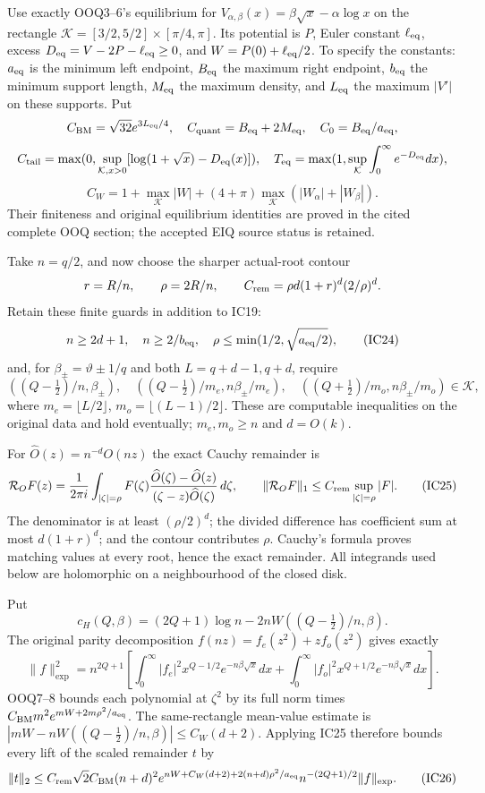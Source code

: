 \documentclass[11pt]{article}
\begin{document}
Use exactly OOQ3--6's equilibrium for \(V_{\alpha,\beta}(x)=\beta\sqrt x-\alpha\log x\) on the rectangle \(\mathcal K=[3/2,5/2]\times[\pi/4,\pi]\). Its potential is \(P\), Euler constant \(\ell_{\rm eq}\), excess \(D_{\rm eq}=V-2P-\ell_{\rm eq}\ge0\), and \(W=P(0)+\ell_{\rm eq}/2\). To specify the constants: \(a_{\rm eq}\) is the minimum left endpoint, \(B_{\rm eq}\) the maximum right endpoint, \(b_{\rm eq}\) the minimum support length, \(M_{\rm eq}\) the maximum density, and \(L_{\rm eq}\) the maximum \(|V'|\) on these supports. Put \[
C_{\rm BM}=\sqrt{32}e^{3L_{\rm eq}/4},\quad
C_{\rm quant}=B_{\rm eq}+2M_{\rm eq},\quad C_0=B_{\rm eq}/a_{\rm eq},
\] \[
C_{\rm tail}=\max(0,\sup_{\mathcal K,x>0}[\log(1+\sqrt x)-D_{\rm eq}(x)]),\quad
T_{\rm eq}=\max(1,\sup_\mathcal K\int_0^\infty e^{-D_{\rm eq}}dx),
\] \[
C_W=1+\max_\mathcal K|W|+
(4+\pi)\max_\mathcal K(|W_\alpha|+|W_\beta|).
\] Their finiteness and original equilibrium identities are proved in the cited complete OOQ section; the accepted EIQ source status is retained.

Take \(n=q/2\), and now choose the sharper actual-root contour \[
r=R/n,\qquad \rho=2R/n,\qquad
C_{\rm rem}=\rho d(1+r)^d(2/\rho)^d.
\] Retain these finite guards in addition to IC19: \[
n\ge2d+1,\quad n\ge2/b_{\rm eq},\quad
\rho\le\min(1/2,\sqrt{a_{\rm eq}/2}),
\tag{IC24}
\] and, for \(\beta_\pm=\vartheta\pm1/q\) and both \(L=q+d-1,q+d\), require \[
((Q-\tfrac12)/n,\beta_\pm),\quad
((Q-\tfrac12)/m_e,n\beta_\pm/m_e),\quad
((Q+\tfrac12)/m_o,n\beta_\pm/m_o)\in\mathcal K,
\] where \(m_e=\lfloor L/2\rfloor\), \(m_o=\lfloor(L-1)/2\rfloor\). These are computable inequalities on the original data and hold eventually; \(m_e,m_o\ge n\) and \(d=O(k)\).

For \(\widehat O(z)=n^{-d}O(nz)\) the exact Cauchy remainder is \[
\mathcal R_OF(z)=\frac1{2\pi i}\int_{|\zeta|=\rho}
F(\zeta)\frac{\widehat O(\zeta)-\widehat O(z)}
{(\zeta-z)\widehat O(\zeta)}\,d\zeta,\qquad
\|\mathcal R_OF\|_1\le C_{\rm rem}\sup_{|\zeta|=\rho}|F|.
\tag{IC25}
\] The denominator is at least \((\rho/2)^d\); the divided difference has coefficient sum at most \(d(1+r)^d\); and the contour contributes \(\rho\). Cauchy's formula proves matching values at every root, hence the exact remainder. All integrands used below are holomorphic on a neighbourhood of the closed disk.

Put \[
c_H(Q,\beta)=(2Q+1)\log n-2nW((Q-\tfrac12)/n,\beta).
\] The original parity decomposition \(f(nz)=f_e(z^2)+zf_o(z^2)\) gives exactly \[
\|f\|_{\exp}^2=n^{2Q+1}\left[
\int_0^\infty|f_e|^2x^{Q-1/2}e^{-n\beta\sqrt x}dx+
\int_0^\infty|f_o|^2x^{Q+1/2}e^{-n\beta\sqrt x}dx\right].
\] OOQ7--8 bounds each polynomial at \(\zeta^2\) by its full norm times \(C_{\rm BM}m^2e^{mW+2m\rho^2/a_{\rm eq}}\). The same-rectangle mean-value estimate is \(|mW-nW((Q-\tfrac12)/n,\beta)|\le C_W(d+2)\). Applying IC25 therefore bounds every lift of the scaled remainder \(t\) by \[
\|t\|_2\le C_{\rm rem}\sqrt2 C_{\rm BM}(n+d)^2
e^{nW+C_W(d+2)+2(n+d)\rho^2/a_{\rm eq}}
n^{-(2Q+1)/2}\|f\|_{\exp}.
\tag{IC26}
\]
\end{document}
